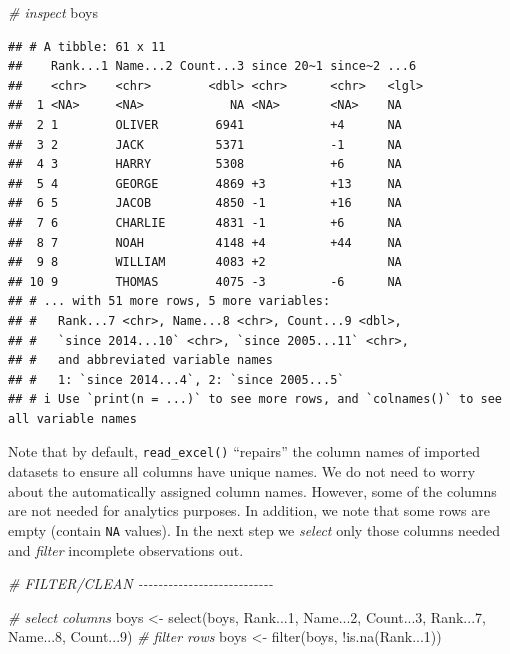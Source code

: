 \documentclass[
  12pt,
]{style/krantz}
\newenvironment{Shaded}{\begin{snugshade}}{\end{snugshade}}
\newcommand{\CommentTok}[1]{\textcolor[rgb]{0.56,0.35,0.01}{\textit{#1}}}
\newcommand{\DecValTok}[1]{\textcolor[rgb]{0.00,0.00,0.81}{#1}}
\newcommand{\FunctionTok}[1]{\textcolor[rgb]{0.00,0.00,0.00}{#1}}
\newcommand{\NormalTok}[1]{#1}
\newcommand{\OtherTok}[1]{\textcolor[rgb]{0.56,0.35,0.01}{#1}}
\newcommand{\SpecialCharTok}[1]{\textcolor[rgb]{0.00,0.00,0.00}{#1}}
\begin{document}
\begin{Shaded}
\begin{Highlighting}[]
\CommentTok{\# inspect}
\NormalTok{boys}
\end{Highlighting}
\end{Shaded}

\begin{verbatim}
## # A tibble: 61 x 11
##    Rank...1 Name...2 Count...3 since 20~1 since~2 ...6 
##    <chr>    <chr>        <dbl> <chr>      <chr>   <lgl>
##  1 <NA>     <NA>            NA <NA>       <NA>    NA   
##  2 1        OLIVER        6941 ­           +4      NA   
##  3 2        JACK          5371 ­           -1      NA   
##  4 3        HARRY         5308 ­           +6      NA   
##  5 4        GEORGE        4869 +3         +13     NA   
##  6 5        JACOB         4850 -1         +16     NA   
##  7 6        CHARLIE       4831 -1         +6      NA   
##  8 7        NOAH          4148 +4         +44     NA   
##  9 8        WILLIAM       4083 +2         ­        NA   
## 10 9        THOMAS        4075 -3         -6      NA   
## # ... with 51 more rows, 5 more variables:
## #   Rank...7 <chr>, Name...8 <chr>, Count...9 <dbl>,
## #   `since 2014...10` <chr>, `since 2005...11` <chr>,
## #   and abbreviated variable names
## #   1: `since 2014...4`, 2: `since 2005...5`
## # i Use `print(n = ...)` to see more rows, and `colnames()` to see all variable names
\end{verbatim}

Note that by default, \texttt{read\_excel()} ``repairs'' the column names of imported datasets to ensure all columns have unique names. We do not need to worry about the automatically assigned column names. However, some of the columns are not needed for analytics purposes. In addition, we note that some rows are empty (contain \texttt{NA} values). In the next step we \emph{select} only those columns needed and \emph{filter} incomplete observations out.

\begin{Shaded}
\begin{Highlighting}[]
\CommentTok{\# FILTER/CLEAN {-}{-}{-}{-}{-}{-}{-}{-}{-}{-}{-}{-}{-}{-}{-}{-}{-}{-}{-}{-}{-}{-}{-}{-}{-}{-}{-}}

\CommentTok{\# select columns}
\NormalTok{boys }\OtherTok{\textless{}{-}} \FunctionTok{select}\NormalTok{(boys, Rank...}\DecValTok{1}\NormalTok{, Name...}\DecValTok{2}\NormalTok{, Count...}\DecValTok{3}\NormalTok{, Rank...}\DecValTok{7}\NormalTok{, Name...}\DecValTok{8}\NormalTok{, Count...}\DecValTok{9}\NormalTok{)}
\CommentTok{\# filter rows}
\NormalTok{boys }\OtherTok{\textless{}{-}}  \FunctionTok{filter}\NormalTok{(boys, }\SpecialCharTok{!}\FunctionTok{is.na}\NormalTok{(Rank...}\DecValTok{1}\NormalTok{))}
\end{Highlighting}
\end{Shaded}
\end{document}
